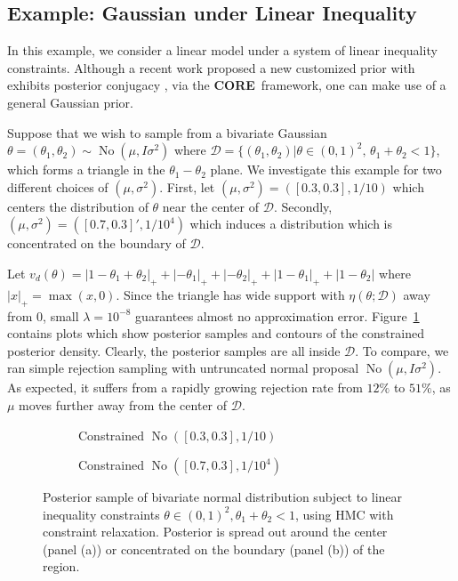 \documentclass[10pt,fleqn]{article}
\newcommand{\core}{\textbf{CORE}}
\newcommand{\mc}[1]{\mathcal{#1}}
\DeclareMathOperator{\No}{No}
\DeclareMathOperator{\1}{\mathbbm{1}}
\begin{document}
\subsection{Example: Gaussian  under Linear Inequality}
In this example, we consider a linear model under a system of linear inequality constraints. Although a
recent work proposed a new customized prior with exhibits posterior conjugacy \citep{danaher2012minkowski},
via the \core\, framework, one can make use of a general Gaussian prior. 

Suppose that we wish to sample from a bivariate Gaussian $\theta=(\theta_1,\theta_2) \sim \No \left( \mu, I\sigma^2\right)$ where $\mathcal{D}=\{(\theta_1,\theta_2) |\theta\in(0,1)^2, \, \theta_1+\theta_2<1\}$,
which forms a triangle in the $\theta_1-\theta_2$ plane.  We investigate this example for two different choices of $(\mu,\sigma^2)$. First, let $(\mu, \sigma^2)=([0.3,0.3],1/{10})$  which centers the distribution of $\theta$ near the center of $\mc D$. Secondly,  $(\mu,\sigma^2) = ([0.7,0.3]',1/10^4)$  which induces a  distribution which is concentrated on the boundary of $\mc D$. 

Let $v_d(\theta)=|1-\theta_1+\theta_2|_+ + |-\theta_1|_+ + |-\theta_2|_+ +|1-\theta_1|_+ +|1-\theta_2| $ where $|x|_+ = \max(x,0)$.  Since the triangle has wide support with $\eta(\theta;\mc D)$ away from $0$, small $\lambda=10^{-8}$
 guarantees almost no approximation error. Figure~\ref{linear_inequality} contains plots which show posterior samples and contours of the constrained posterior density. Clearly, the posterior samples are all inside
$\mc D$. To compare, we ran simple rejection sampling with untruncated normal proposal $\No ( \mu, I\sigma^2)$. As expected, it  suffers from a rapidly growing rejection rate from $12\%$ to $51\%$, as $\mu$ moves further away from the center of $\mc D$.

\begin{figure}[H]
\begin{subfigure}[b]{0.45\textwidth}
\caption{Constrained $\No([0.3,0.3],1/{10})$}
\end{subfigure}
\begin{subfigure}[b]{0.45\textwidth}
\caption{Constrained $\No([0.7,0.3],1/{10^4})$}
\end{subfigure}
\caption{Posterior sample of bivariate normal distribution subject to linear inequality constraints $\theta\in(0,1)^2,\theta_1+\theta_2<1$, using HMC with  constraint relaxation. Posterior is spread out around the center (panel (a)) or concentrated on the boundary (panel (b)) of the region.}
\label{linear_inequality}
\end{figure}
\end{document}

